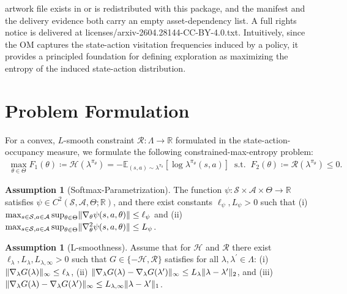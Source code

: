 \documentclass[10pt,a4paper]{amsart}
\def\AA{{\mathcal{A}}}
\providecommand{\Expu}[2]{{\mathbb{E}}_{#1}\!\left[#2\right]}
\def\HH{{\mathcal{H}}}
\def\RR{{\mathbb{R}}}
\def\Reg{{\mathcal{R}}}
\def\SS{{\mathcal{S}}}
\def\aa{{a}}
\providecommand{\define}{\coloneqq}
\def\gradPsi{{\ell_{\psi}}}
\def\jacPsi{{L_{\psi}}}
\DeclarePairedDelimiter{\norm}{\lVert}{\rVert}
\def\ss{{s}}
\theoremstyle{plain}
\theoremstyle{definition}
\newtheorem{assumption}[theorem]{Assumption}
\theoremstyle{remark}
\begin{document}
artwork file exists in or is redistributed with this package, and the manifest and the delivery evidence both carry an empty asset-dependency list. A full rights notice is delivered at licenses/arxiv-2604.28144-CC-BY-4.0.txt.
\setcounter{section}{1}
Intuitively, since the OM captures the state-action visitation frequencies
induced by a policy, it provides a principled foundation for defining
exploration as maximizing the entropy of the induced state-action
distribution.

\section{Problem Formulation}
\label{sec:ProblemFormulation}
For a convex, $L$-smooth constraint $\Reg: \Lambda \to \RR$ formulated in
the state-action-occupancy measure, we formulate the following
constrained-max-entropy problem:
\begin{align}
 \max_{\theta \in \Theta} F_1(\theta)  \define \HH(\lambda^{\pi_\theta})
 = - \Expu{(\ss, \aa) \sim \lambda^{\pi_\theta}}{\log \lambda^{\pi_\theta}(\ss, \aa)} \;\;
 \mathrm{s.t.} \;\; F_2(\theta)        \define
 \Reg(\lambda^{\pi_\theta}) \leq 0.
 \tag{CME}
 \label{eq:MainProblemRL}
\end{align}

\setcounter{section}{5}
\setcounter{theorem}{0}
\begin{assumption}[Softmax-Parametrization]\label{ass:Softmax}
 The function $\psi : \SS \times \AA \times \Theta \to \RR$
 satisfies $\psi \in C^2(\SS, \AA, \Theta; \RR)$, and there exist
 constants $\gradPsi, \jacPsi > 0$ such that
 (i) $\max_{\ss\in\SS, \aa\in\AA} \sup_{\theta \in \Theta}
  \norm{\nabla_\theta \psi(\ss, \aa, \theta)} \leq \gradPsi$
 and (ii) $\max_{\ss\in\SS, \aa\in\AA} \sup_{\theta \in \Theta}
  \norm{\nabla^2_\theta \psi(\ss, \aa, \theta)} \leq \jacPsi$.
 \end{assumption}

\setcounter{theorem}{2}
\begin{assumption}[L-smoothness]
 \label{ass:Lsmoothness}
 Assume that for $\HH$ and $\Reg$ there exist
 $\ell_\lambda, L_\lambda, L_{\lambda, \infty} > 0$
 such that $G \in \{-\HH, \Reg\}$ satisfies for
 all $\lambda, \lambda^\prime \in \Lambda$:
 (i) $\norm{\nabla_\lambda G(\lambda)}_{\infty} \leq \ell_\lambda$,
 (ii) $\norm{\nabla_{\lambda} G(\lambda) - \nabla_\lambda G(\lambda^\prime)}_{\infty}
  \leq L_\lambda \norm{\lambda - \lambda^\prime}_2$, and
 (iii) $\norm{\nabla_{\lambda} G(\lambda) - \nabla_\lambda G(\lambda^\prime)}_{\infty}
  \leq L_{\lambda, \infty} \norm{\lambda - \lambda^\prime}_1$.
\end{assumption}
\end{document}
